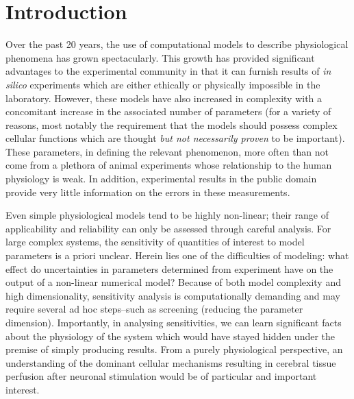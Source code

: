 \section{Introduction}\label{sec:intro}
Over the past 20 years, the use of computational models to describe physiological phenomena has grown spectacularly. This growth has provided significant advantages to the experimental community in that it can furnish results of \textit{in silico} experiments which are either ethically or physically impossible in the laboratory. However, these models have also increased in complexity with a concomitant increase in the associated number of parameters (for a variety of reasons, most notably the requirement that the models should possess complex cellular functions which are thought \textit{but not necessarily proven} to be important). These parameters, in defining the relevant phenomenon, more often than not come from a plethora of animal experiments whose relationship to the human physiology is weak.  In addition, experimental results in the public domain provide very little information on the errors in these measurements. 

Even simple physiological models tend to be  highly non-linear; their range of applicability and reliability can only be assessed  through careful analysis. For large complex systems, the sensitivity of quantities of interest to model parameters is a priori unclear. Herein lies one of the difficulties of modeling: what effect do uncertainties in parameters determined from experiment have on the output of a non-linear numerical model? Because of both model complexity and high dimensionality, sensitivity analysis is  computationally demanding and may require several ad hoc steps--such as screening (reducing the parameter dimension). Importantly, in analysing  sensitivities, we can learn significant facts about the physiology of the system which would have stayed hidden under the premise of simply producing results. 
From a purely physiological perspective, an understanding of the dominant cellular mechanisms resulting in cerebral tissue perfusion after neuronal stimulation would be of particular and important interest. 


